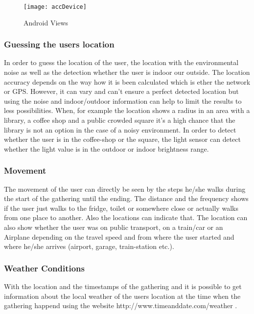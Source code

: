 {\begin{figure}[!htb]
\centering
\texttt{[image: accDevice]}
\caption{Android Views}\label{accDev}
\vspace{10 mm}
\end{figure}

\FloatBarrier

\subsubsection{Guessing the users location}
In order to guess the location of the user, the location with the environmental noise as well as the detection whether the user is indoor our outside. The location accuracy depends on the way how it is been calculated which is ether the network or GPS. However, it can vary and can't ensure a perfect detected location but using the noise and indoor/outdoor information can help to limit the results to less possibilities. When, for example the location shows a radius in an area with a library, a coffee shop and a public crowded square it's a high chance that the library is not an option in the case of a noisy environment. In order to detect whether the user is in the coffee-shop or the square, the light sensor can detect whether the light value is in the outdoor or indoor brightness range. 

\subsubsection{Movement}
The movement of the user can directly be seen by the steps he/she walks during the start of the gathering until the ending. The distance and the frequency shows if the user just walks to the fridge, toilet or somewhere close or actually walks from one place to another. Also the locations can indicate that. 
The location can also show whether the user was on public transport, on a train/car or an Airplane depending on the travel speed and from where the user started and where he/she arrives (airport, garage, train-station etc.). 

\subsubsection{Weather Conditions}
With the location and the timestamps of the gathering and it is possible to get information about the local weather of the users location at the time when the gathering happend using the website   http://www.timeanddate.com/weather \cite{weatherArchive}.

}
